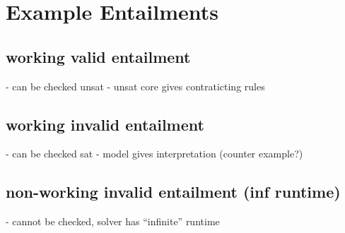 \documentclass[a4paper]{article}
\begin{document}
\section{Example Entailments}
\subsection{working valid entailment}
- can be checked unsat
- unsat core gives contraticting rules

\subsection{working invalid entailment}
- can be checked sat
- model gives interpretation (counter example?)

\subsection{non-working invalid entailment (inf runtime)}
- cannot be checked, solver has ``infinite'' runtime
\end{document}
